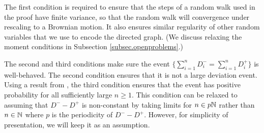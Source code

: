The first condition is required to ensure that the steps of a random walk used in the proof have finite variance, so that the random walk will convergence under rescaling to a Brownian motion. It also ensures similar regularity of other random variables that we use to encode the directed graph. (We discuss relaxing the moment conditions in Subsection \ref{subsec.openproblems}.)

The second and third conditions make sure the event $\{\sum_{i=1}^n D^-_i = \sum_{i=1}^n D^+_i\}$ is well-behaved. The second condition ensures that it is not a large deviation event. Using a result from \citet[Page 42, P1]{spitzerPrinciplesRandomWalk1964}, the third condition ensures that the event has positive probability for all sufficiently large $n \geq 1$. This condition can be relaxed to assuming that $D^- - D^+$ is non-constant by taking limits for $n \in p {\mathbb N}$ rather than $n \in {\mathbb N}$ where $p$ is the periodicity of $D^- - D^+$. However, for simplicity of presentation, we will keep it as an assumption.

